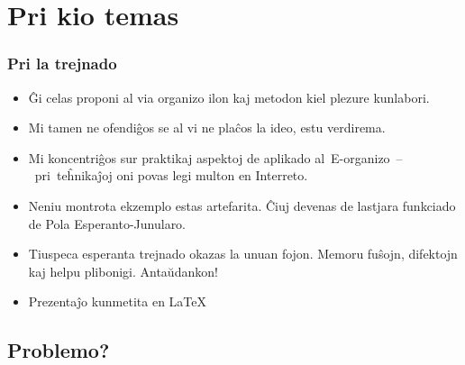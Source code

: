  
\section{Pri kio temas}


  \begin{frame}
    \frametitle{Pri la trejnado}

	
	\begin{itemize}

		\item<-1> Ĝi celas proponi al via organizo ilon kaj metodon kiel plezure kunlabori.
		
		\item<-1> Mi tamen ne ofendiĝos se al vi ne plaĉos la ideo, estu verdirema.
		
		\item<2-2> Mi koncentriĝos sur praktikaj aspektoj de aplikado al~E-organizo~--~pri~teĥnikaĵoj oni povas legi multon en Interreto.
	
		\item<2-2> Neniu montrota ekzemplo estas artefarita. Ĉiuj devenas de lastjara funkciado de Pola Esperanto-Junularo.
		
		\item<3-3> Tiuspeca esperanta trejnado okazas la unuan fojon. Memoru fuŝojn, difektojn kaj helpu plibonigi. Antaŭdankon!
				
		\item<3-3> Prezentaĵo kunmetita en \LaTeX
				
	\end{itemize}
  \end{frame}


\subsection{Problemo?}

